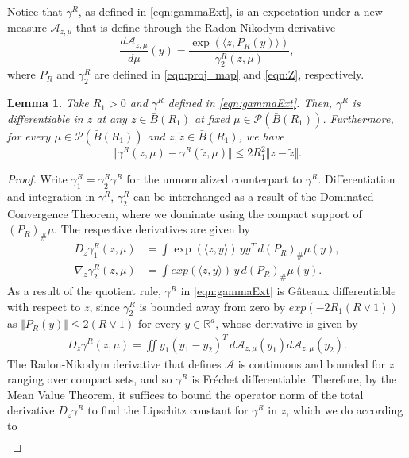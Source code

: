 \documentclass{article}
\newtheorem{lemma}[theorem]{Lemma}
\newcommand{\R}{\mathbb{R}}
\begin{document}
\begin{appendices}
Notice that $\gamma^R$, as defined in \eqref{eqn:gammaExt}, is an expectation under a new measure $\mathcal A_{z,\mu}$ that is define through the Radon-Nikodym derivative
\begin{equation}\label{eqn:GammaMeasureChange}
      \frac{d \mathcal A_{z,\mu}}{d\mu}(y) = \frac{\exp( \langle z, P_R(y)\rangle)}{\gamma^R_{2}(z,\mu)},
\end{equation}
where $P_R$ and $\gamma^R_{2}$ are defined in \eqref{eqn:proj_map} and \eqref{eqn:Z}, respectively.
\begin{lemma}\label{lemma:GammaLipz}
    Take $R_1>0$ and $\gamma^R$ defined in \eqref{eqn:gammaExt}. Then, $\gamma^R$ is differentiable in $z$ at any $z \in \bar B(R_1)$ at fixed $\mu\in \mathcal P(\bar B(R_1))$. Furthermore, for every $\mu\in\mathcal P(\bar B(R_1))$  and $z,\tilde{z}\in \bar B(R_1)$, we have
    \[\Vert \gamma^R(z,\mu)-\gamma^R(\tilde{z},\mu)\Vert \leq 2 R_1^2\Vert z-\tilde{z}\Vert. \]
\end{lemma}
\begin{proof}
Write $\gamma^R_{1}=\gamma^R_{2}\gamma^R$ for the unnormalized counterpart to $\gamma^R$.
Differentiation and integration in $\gamma^R_1$, $\gamma^R_2$ can be interchanged as a result of the Dominated Convergence Theorem, where we dominate using the compact support of $(P_R)_{\#}\mu$. The respective derivatives are given by
\begin{align*}
    D_z\gamma^R_1(z,\mu) &= \int \exp( \langle z,  y \rangle) \,y y^T \, d(P_R)_{\#}\mu(y), \\ \nabla_z \gamma^R_2(z,\mu) &= \int exp( \langle z,  y \rangle)\,y \, d(P_R)_{\#}\mu(y).
\end{align*}
 As a result of the quotient rule, $\gamma^R$ in \eqref{eqn:gammaExt} is G\^ateaux differentiable with respect to $z$, since $\gamma^R_2$ is bounded away from zero by $exp(-2R_1(R\vee1))$ as $\Vert P_R(y)\Vert\le 2(R\vee 1)$ for every $y\in \R^d$, whose derivative is given by
\begin{align}\label{eqn:Dzgamma}
    D_z\gamma^R(z,\mu)
=  \iint y_1 (y_1 - y_2)^T\, d\mathcal{A}_{z, \mu}(y_1)d\mathcal{A}_{z, \mu}(y_2).
\end{align}
The Radon-Nikodym derivative that defines $\mathcal A$ is continuous and bounded for $z$ ranging over compact sets, and so $\gamma^R$ is Fr\'echet differentiable.
Therefore, by the Mean Value Theorem, it suffices to bound the operator norm of the total derivative $D_z\gamma^R$ to find the Lipschitz constant for $\gamma^R$ in $z$, which we do according to 
\begin{align*}

\end{align*}
\end{proof}
\end{appendices}
\end{document}
